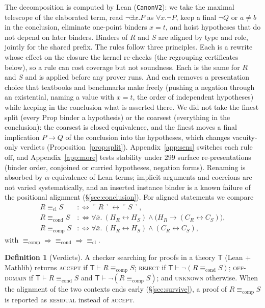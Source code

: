 \documentclass[10pt]{article}
\theoremstyle{definition}
\newtheorem{definition}[theorem]{Definition}
\newcommand{\T}{\mathsf{T}}
\newcommand{\Cl}[1]{\ulcorner #1 \urcorner}
\newcommand{\Ecl}{\mathrel{\equiv_{\mathrm{cl}}}}
\newcommand{\Econd}{\mathrel{\equiv_{\mathrm{cond}}}}
\newcommand{\Ecomp}{\mathrel{\equiv_{\mathrm{comp}}}}
\newcommand{\V}[1]{\textsc{#1}}
\begin{document}
The decomposition is computed by Lean (\texttt{CanonV2}): we take the maximal telescope of the
elaborated term, read $\neg\exists x.P$ as $\forall x.\neg P$, keep a final $\neg Q$ or $a\ne b$
in the conclusion, eliminate one-point binders $x=t$, and hoist hypotheses that do not depend on
later binders. Binders of $R$ and $S$ are aligned by type and role, jointly for the shared prefix.
The rules follow three principles. Each is a rewrite whose effect on the closure the kernel
re-checks (the regrouping certificates below), so a rule can cost coverage but not soundness.
Each is the same for $R$ and $S$ and is applied before any prover runs. And each removes a
presentation choice that textbooks and benchmarks make freely (pushing a negation through an
existential, naming a value with $x=t$, the order of independent hypotheses) while keeping in the
conclusion what is asserted there. We did not take the finest split (every Prop binder a
hypothesis) or the coarsest (everything in the conclusion): the coarsest is closed equivalence,
and the finest moves a final implication $P\to Q$ of the conclusion into the hypotheses, which
changes vacuity-only verdicts (Proposition~\ref{prop:split}). Appendix~\ref{app:sens} switches
each rule off, and Appendix~\ref{app:more} tests stability under 299 surface re-presentations
(binder order, conjoined or curried hypotheses, negation forms). Renaming is absorbed by
$\alpha$-equivalence of Lean terms; implicit arguments and coercions are not varied
systematically, and an inserted instance binder is a known failure of the positional
alignment (\S\ref{sec:conclusion}).
For aligned statements we compare
\begin{align*}
R\Ecl S &:\iff \Cl R\leftrightarrow\Cl S,\\
R\Econd S &:\iff \forall\bar x.\ (H_R\leftrightarrow H_S)\wedge\bigl(H_R\to(C_R\leftrightarrow C_S)\bigr),\\
R\Ecomp S &:\iff \forall\bar x.\ (H_R\leftrightarrow H_S)\wedge(C_R\leftrightarrow C_S),
\end{align*}
with $\Ecomp\Rightarrow\Econd\Rightarrow\Ecl$.

\begin{definition}[Verdicts]
A checker searching for proofs in a theory $\T$ (Lean + Mathlib) returns
\V{accept} if $\T\vdash R\Ecomp S$;
\V{reject} if $\T\vdash\neg(R\Econd S)$;
\V{off-domain} if $\T\vdash R\Econd S$ and $\T\vdash\neg(R\Ecomp S)$;
and \V{unknown} otherwise. When the alignment of the two contexts ends early
(\S\ref{sec:survive}), a proof of $R\Ecomp S$ is reported as \V{residual} instead of \V{accept}.
\end{definition}
\end{document}
